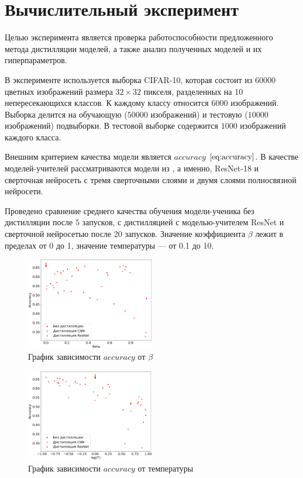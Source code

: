 \documentclass[12pt, twoside]{article}
\begin{document}
\section{Вычислительный эксперимент}

Целью эксперимента является проверка работоспособности предложенного метода дистилляции моделей, а также анализ полученных моделей и их гиперпараметров.

В эксперименте используется выборка CIFAR-10, которая состоит из $60000$ цветных изображений размера $32 \times 32$ пикселя, разделенных на 10 непересекающихся классов. К каждому классу относится $6000$ изображений. Выборка делится на обучающую ($50000$ изображений) и тестовую ($10000$ изображений) подвыборки. В тестовой выборке содержится $1000$ изображений каждого класса.

Внешним критерием качества модели является $accuracy$ $\eqref{eq:accuracy}$. В качестве моделей-учителей рассматриваются модели из \cite{conf/cvpr/PassalisTT20}, а именно, ResNet-18 и сверточная нейросеть с тремя сверточными слоями и двумя слоями полносвязной нейросети.

Проведено сравнение среднего качества обучения модели-ученика без дистилляции после $5$ запусков, с дистилляцией с моделью-учителем ResNet и сверточной нейросетью после 20 запусков. Значение коэффициента $\beta$ лежит в пределах от 0 до 1, значение температуры --- от 0.1 до 10.

\begin{figure}[!ht]
    \centering
    \includegraphics[width=0.5\textwidth]{scatter_beta_acc.eps}
    \caption{График зависимости $accuracy$ от $\beta$}
    \label{fig:beta_acc}
\end{figure}

\begin{figure}[!ht]
    \centering
    \includegraphics[width=0.5\textwidth]{scatter_temp_acc.eps}
    \caption{График зависимости $accuracy$ от температуры}
    \label{fig:temp_acc}
\end{figure}
\end{document}
